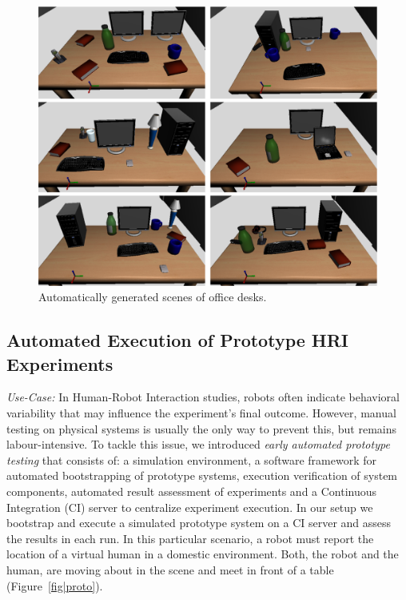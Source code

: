 \documentclass[conference]{IEEEtran}
\begin{document}
\begin{figure}[tb]
  \centering
  \includegraphics[width=.9\columnwidth]{figs/scenes.png}
  \caption{Automatically generated scenes of office desks.}
  \label{fig:simulated-desktop-scenes}
\end{figure}


\subsection{Automated Execution of Prototype HRI Experiments}
\label{sc:ci}

\emph{Use-Case:} In Human-Robot Interaction studies, robots often indicate
behavioral variability that may influence the experiment's final outcome.
However, manual testing on physical systems is usually the only way to prevent
this, but remains labour-intensive. To tackle this issue, we introduced
\emph{early automated prototype testing} \cite{2645922} that consists of: a
simulation environment, a software framework for automated bootstrapping of
prototype systems, execution verification of system components, automated result
assessment of experiments \cite{2563606} and a Continuous Integration (CI)
\cite{duvall2007continuous} server to centralize experiment execution. In our
setup we bootstrap and execute a simulated prototype system on a CI server and
assess the results in each run. In this particular scenario, a robot must report
the location of a virtual human in a domestic environment. Both, the robot and
the human, are moving about in the scene and meet in front of a table
(Figure~\ref{fig|proto}).
\end{document}
